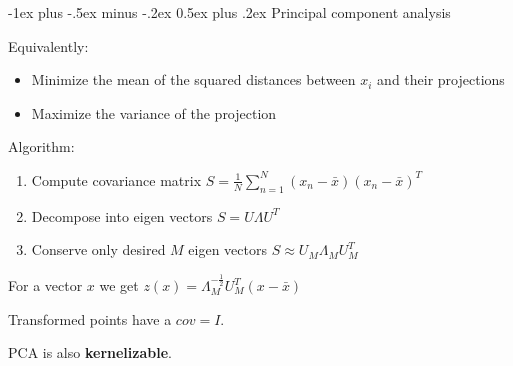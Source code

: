 \documentclass[10pt,landscape]{article}
\makeatletter
\renewcommand{\section}{\@startsection{section}{1}{0mm}%
                                {-1ex plus -.5ex minus -.2ex}%
                                {0.5ex plus .2ex}%
                                {\normalfont\large\bfseries}}
\makeatother
\begin{document}
\begin{multicols}{3}
\section{Principal component analysis}

Equivalently:

\begin{itemize}
\item Minimize the mean of the squared distances between $x_i$ and their projections
\item Maximize the variance of the projection
\end{itemize}

Algorithm:
\begin{enumerate}
\item Compute covariance matrix $S = \frac{1}{N} \sum_{n=1}^N (x_n - \bar x) (x_n - \bar x)^T$
\item Decompose into eigen vectors $S=U \Lambda U^T$
\item Conserve only desired $M$ eigen vectors $S \approx U_M \Lambda_M U_M^T$
\end{enumerate}

For a vector $x$ we get $z(x) = \Lambda_M^{-\frac{1}{2}} U_M^T (x - \bar x)$

Transformed points have a $cov = I$.

PCA is also \textbf{kernelizable}.

\end{multicols}
\end{document}
